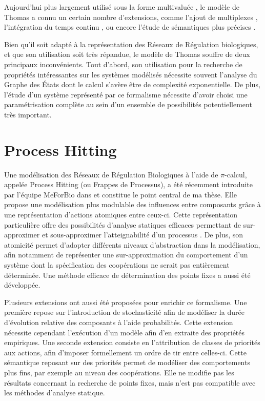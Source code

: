 Aujourd'hui plus largement utilisé sous la forme multivaluée \cite{richard-comet-bernot-08}, le modèle de Thomas a connu un certain nombre d'extensions,
comme l'ajout de multiplexes \cite{bernot-comet-khalis-08},
l'intégration du temps continu \cite{Ahmad08},
ou encore l'étude de sémantiques plus précises \cite{BernotSemBRN}.


Bien qu'il soit adapté à la représentation des Réseaux de Régulation biologiques, et que son utilisation soit très répandue, le modèle de Thomas souffre de deux principaux inconvénients.
Tout d'abord, son utilisation pour la recherche de propriétés intéressantes sur les systèmes modélisés nécessite souvent l'analyse du Graphe des États dont le calcul s'avère être de complexité exponentielle.
De plus, l'étude d'un système représenté par ce formalisme nécessite d'avoir choisi une paramétrisation complète au sein d'un ensemble de possibilités potentiellement très important.

\section{Process Hitting}
Une modélisation des Réseaux de Régulation Biologiques à l'aide de $\pi$-calcul, appelée Process Hitting (ou Frappes de Processus), a été récemment introduite par l'équipe MeForBio dans \cite{PMR10-TCSB,PaulevePhD} et constitue le point central de ma thèse.
Elle propose une modélisation plus modulable des influences entre composants grâce à une représentation d'actions atomiques entre ceux-ci.
Cette représentation particulière offre des possibilités d'analyse statiques efficaces permettant de sur-approximer et sous-approximer l'atteignabilité d'un processus \cite{PMR12-MSCS}.
De plus, son atomicité permet d'adopter différents niveaux d'abstraction dans la modélisation, afin notamment de représenter une sur-approximation du comportement d'un système dont la spécification des coopérations ne serait pas entièrement déterminée.
Une méthode efficace de détermination des points fixes a aussi été développée.

Plusieurs extensions ont aussi été proposées pour enrichir ce formalisme.
Une première repose sur l'introduction de stochasticité afin de modéliser la durée d'évolution relative des composants à l'aide probabilités.
Cette extension nécessite cependant l'exécution d'un modèle afin d'en extraite des propriétés empiriques.
Une seconde extension consiste en l'attribution de classes de priorités aux actions, afin d'imposer formellement un ordre de tir entre celles-ci.
Cette sémantique reposant sur des priorités permet de modéliser des comportements plus fins, par exemple au niveau des coopérations.
Elle ne modifie pas les résultats concernant la recherche de points fixes, mais n'est pas compatible avec les méthodes d'analyse statique.

